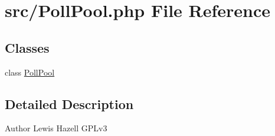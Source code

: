 \hypertarget{PollPool_8php}{\section{src/\-Poll\-Pool.php File Reference}
\label{PollPool_8php}
}
\subsection*{Classes}
\begin{DoxyCompactItemize}
\item 
class \hyperlink{classPollPool}{Poll\-Pool}
\end{DoxyCompactItemize}


\subsection{Detailed Description}
\begin{DoxyAuthor}{Author}
Lewis Hazell  G\-P\-Lv3 
\end{DoxyAuthor}
